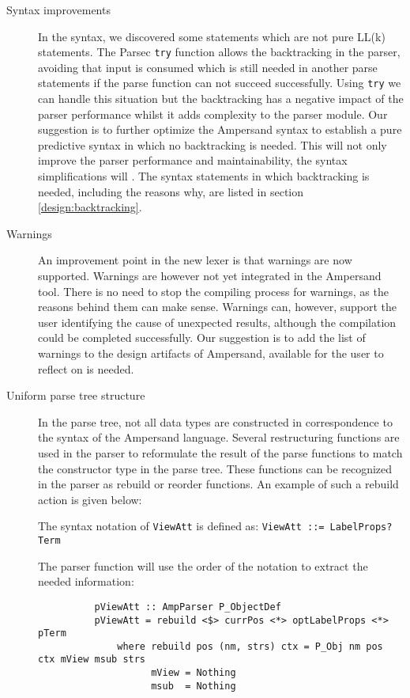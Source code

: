 \begin{description}
  \item[Syntax improvements]
    In the syntax, we discovered some statements which are not pure LL(k) statements.
    The Parsec \texttt{try} function allows the backtracking in the parser, avoiding that input is consumed which is still needed in another parse statements if the parse function can not succeed successfully.
    Using \texttt{try} we can handle this situation but the backtracking has a negative impact of the parser performance whilst it adds complexity to the parser module. 
    Our suggestion is to further optimize the Ampersand syntax to establish a pure predictive syntax in which no backtracking is needed.
    This will not only improve the parser performance and maintainability, the syntax simplifications will .
    The syntax statements in which backtracking is needed, including the reasons why, are listed in section \autoref{design:backtracking}.

  \item[Warnings]
    An improvement point in the new lexer is that warnings are now supported. 
    Warnings are however not yet integrated in the Ampersand tool.
    There is no need to stop the compiling process for warnings, as the reasons behind them can make sense.
    Warnings can, however, support the user identifying the cause of unexpected results, although the compilation could be completed successfully.
    Our suggestion is to add the list of warnings to the design artifacts of Ampersand, available for the user to reflect on is needed.

  \item[Uniform parse tree structure]
  
   In the parse tree, not all data types are constructed in correspondence to the syntax of the Ampersand language.
   Several restructuring functions are used in the parser to reformulate the result of the parse functions to match the constructor type in the parse tree.
   These functions can be recognized in the parser as rebuild or reorder functions.
   An example of such a rebuild action is given below:

   The syntax notation of \texttt{ViewAtt} is defined as: \texttt{ViewAtt ::= LabelProps? Term}
   
   The parser function will use the order of the notation to extract the needed information:

   \begin{verbatim}
          pViewAtt :: AmpParser P_ObjectDef
          pViewAtt = rebuild <$> currPos <*> optLabelProps <*> pTerm
              where rebuild pos (nm, strs) ctx = P_Obj nm pos ctx mView msub strs
                    mView = Nothing
                    msub  = Nothing
    \end{verbatim}
 

\end{description}
